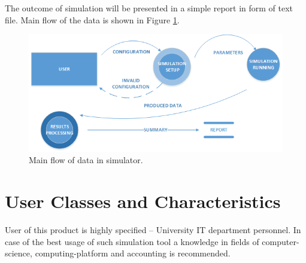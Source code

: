 	The outcome of simulation will be presented in a simple report in form of text file. Main flow of the data is shown in Figure \ref{fig:main-flow-of-data}.
	
	\begin{figure}
		\centering
		\includegraphics[width=\textwidth]{../visio-files/main-flow-of-data}
		\caption{Main flow of data in simulator.}
		\label{fig:main-flow-of-data}
	\end{figure}
\section{User Classes and Characteristics}

	User of this product is highly specified -- University IT department personnel. In case of the best usage of such simulation tool a knowledge in fields of computer-science, \gls{computing-platform} and accounting is recommended. 

